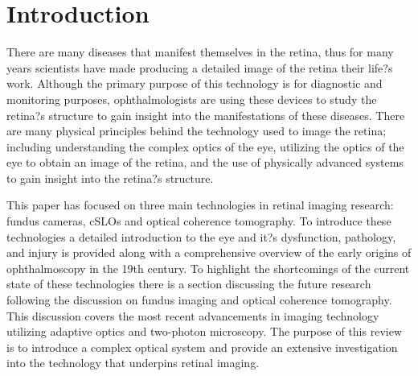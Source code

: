 \chapter{Introduction}

\label{intro}

There are many diseases that manifest themselves in the 
retina, thus for many years scientists have made producing a 
detailed image of the retina their life?s work.  Although the primary 
purpose of this technology is for diagnostic and monitoring purposes, 
ophthalmologists are using these devices to study the retina?s 
structure to gain insight into the manifestations of these diseases.  
There are many physical principles behind the technology used to 
image the retina; including understanding the complex optics of the 
eye, utilizing the optics of the eye to obtain an image of the retina, 
and the use of physically advanced systems to gain insight into the 
retina?s structure.

This paper has focused on three main technologies in retinal 
imaging research: fundus cameras, cSLOs and optical coherence 
tomography. To introduce these technologies a detailed introduction 
to the eye and it?s dysfunction, pathology, and injury is provided 
along with a comprehensive overview of the early origins of 
ophthalmoscopy in the 19th century.  To highlight the shortcomings 
of the current state of these technologies there is a section discussing 
the future research following the discussion on fundus imaging and 
optical coherence tomography.  This discussion covers the 
most recent advancements in imaging technology utilizing adaptive 
optics and two-photon microscopy.  The purpose of this review is to 
introduce a complex optical system and provide an extensive 
investigation into the technology that underpins retinal imaging.